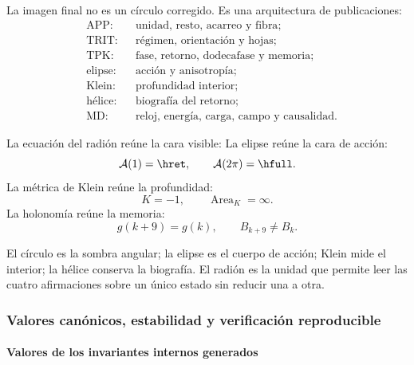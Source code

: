 La imagen final no es un círculo corregido. Es una arquitectura de
publicaciones:
\[
\begin{aligned}
&\text{APP:}&&\text{unidad, resto, acarreo y fibra};\\
&\text{TRIT:}&&\text{régimen, orientación y hojas};\\
&\text{TPK:}&&\text{fase, retorno, dodecafase y memoria};\\
&\text{elipse:}&&\text{acción y anisotropía};\\
&\text{Klein:}&&\text{profundidad interior};\\
&\text{hélice:}&&\text{biografía del retorno};\\
&\text{MD:}&&\text{reloj, energía, carga, campo y causalidad}.
\end{aligned}
\]

La ecuación del radión reúne la cara visible:
\BigRadionEquation
La elipse reúne la cara de acción:
\[
\mathcal A(1)=\hret,\qquad \mathcal A(2\pi)=\hfull.
\]
La métrica de Klein reúne la profundidad:
\[
K=-1,\qquad \operatorname{Area}_K=\infty.
\]
La holonomía reúne la memoria:
\[
g(k+9)=g(k),\qquad B_{k+9}\ne B_k.
\]

\begin{thesisbox}
El círculo es la sombra angular; la elipse es el cuerpo de acción; Klein mide
el interior; la hélice conserva la biografía. El radión es la unidad que
permite leer las cuatro afirmaciones sobre un único estado sin reducir una a
otra.
\end{thesisbox}
\subsubsection{Valores canónicos, estabilidad y verificación reproducible}

\paragraph{Valores de los invariantes internos generados}

